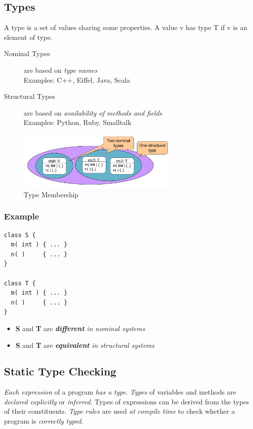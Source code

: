 \subsection{Types}
\begin{definition}[Types]
A type is a set of values sharing some properties. A value v has type T if v is an element of type. 
\end{definition}
\begin{description}
 \item[Nominal Types] are based on \emph{type names}\\
  Examples: C++, Eiffel, Java, Scala
 \item[Structural Types] are based on \emph{availability of methods and fields}\\
 Examples: Python, Ruby, Smalltalk
\end{description}

\begin{figure}[H]
  \centering
    \includegraphics[width=0.7\textwidth]{img/02_nominal_types}
      \caption{Type Membership}
\end{figure}

\subsubsection{Example}

\lstset{language=C}
\begin{lstlisting}
class S {
  m( int ) { ... }
  n( )     { ... }
}

class T {
  m( int ) { ... }
  n( )     { ... }
}
\end{lstlisting}
\begin{itemize}
 \item \textbf S and \textbf T are \emph{\textbf{different} in nominal systems}
 \item \textbf S and \textbf T are \emph{\textbf{equivalent} in structural systems}
\end{itemize}

\subsection{Static Type Checking}
\emph{Each expression} of a program \emph{has a type}. \emph{Types} of variables and methods are \emph{declared explicitly} or \emph{inferred}. Types of expressions can be derived from the types of their constituents. \emph{Type rules} are used \emph{at compile time} to check whether a program is \emph{correctly typed}.
